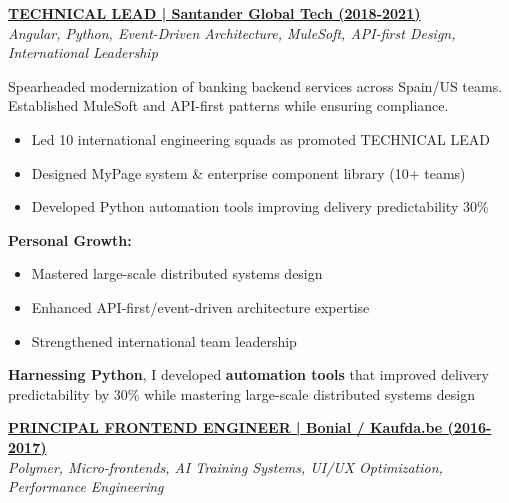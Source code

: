 \documentclass[a4paper,10pt]{article}
\begin{document}
\begin{minipage}{\textwidth}
	\vspace{0.4cm}

    \noindent\uline{\textbf{TECHNICAL LEAD | Santander Global Tech (2018-2021)}} \\
	\vspace{0.1cm}
	{\small\textit{Angular, Python, Event-Driven Architecture, MuleSoft, API-first Design, International Leadership}}
	\vspace{0.2cm}

	Spearheaded modernization of banking backend services across Spain/US teams. Established MuleSoft and API-first patterns while ensuring compliance.

	\vspace{0.2cm}
	\begin{itemize}[label=\textcolor{darkblue}{\textbullet}, leftmargin=*, nosep]
		\item Led 10 international engineering squads as promoted TECHNICAL LEAD
		\item Designed MyPage system \& enterprise component library (10+ teams)
		\item Developed Python automation tools improving delivery predictability 30\%
	\end{itemize}

	\vspace{0.2cm}
	\textbf{Personal Growth:}
	\vspace{0.2cm}
	\begin{itemize}[label=\textcolor{darkblue}{\textbullet}, leftmargin=*, nosep]
		\item Mastered large-scale distributed systems design
		\item Enhanced API-first/event-driven architecture expertise
		\item Strengthened international team leadership
	\end{itemize}

    \vspace{0.2cm}

    \textbf{Harnessing Python}, I developed \textbf{automation tools} that improved delivery predictability by 30\% while mastering large-scale distributed systems design

	\vspace{0.4cm}

    \noindent\uline{\textbf{PRINCIPAL FRONTEND ENGINEER | Bonial / Kaufda.be (2016-2017)}} \\
	\vspace{0.1cm}
	{\small\textit{Polymer, Micro-frontends, AI Training Systems, UI/UX Optimization, Performance Engineering}}
	\vspace{0.2cm}


\end{minipage}
\end{document}
